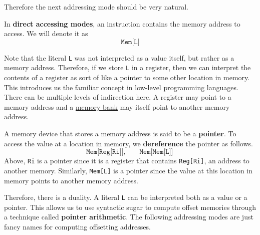   Therefore the next addressing mode should be very natural. 

  \begin{definition}
    \label{def:direct-addressing}
    In \textbf{direct accessing modes}, an instruction contains the memory address to access. We will denote it as 
    \begin{equation}
      \texttt{Mem[L]}
    \end{equation}
  \end{definition}

  Note that the literal \texttt{L} was not interpreted as a value itself, but rather as a memory address. Therefore, if we store \texttt{L} in a register, then we can interpret the contents of a register as sort of like a pointer to some other location in memory. This introduces us the familiar concept in low-level programming languages. There can be multiple levels of indirection here. A register may point to a memory address and a \hyperref[def:memory-bank]{memory bank} may itself point to another memory address. 

  \begin{definition}[Pointer]
    \label{def:pointer}
    A memory device that stores a memory address is said to be a \textbf{pointer}. To access the value at a location in memory, we \textbf{dereference} the pointer as follows. 
    \begin{equation}
      \texttt{Mem[Reg[Ri]]}, \qquad \texttt{Mem[Mem[L]]}
    \end{equation}
    Above, \texttt{Ri} is a pointer since it is a register that contains \texttt{Reg[Ri]}, an address to another memory. Similarly, \texttt{Mem[L]} is a pointer since the value at this location in memory points to another memory address. 
  \end{definition}

  Therefore, there is a duality. A literal \texttt{L} can be interpreted both as a value or a pointer. This allows us to use syntactic sugar to compute offset memories through a technique called \textbf{pointer arithmetic}. The following addressing modes are just fancy names for computing offsetting addresses. 

